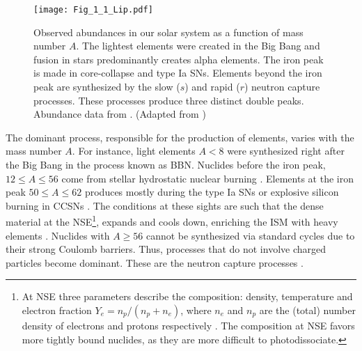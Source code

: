 \begin{figure}[t]
    \centering
    \texttt{[image: Fig\_1\_1\_Lip.pdf]}
    \caption{Observed abundances in our solar system as a function of mass number
        $A$. The lightest elements were created in the Big Bang and fusion in stars predominantly
        creates alpha elements. The iron peak is made in core-collapse and type
        Ia \acp{SN}. Elements beyond the iron peak are synthesized by the slow ($s$) and
        rapid ($r$) neutron capture processes. These processes produce three distinct double
        peaks. Abundance data from \citet{Lodders:2003}. (Adapted from \citet{Lippuner:2018phd})
    }
    \label{fig:nuc:fig11_lip}
\end{figure}


The dominant \nuc{} process, responsible for the production of elements, varies with the mass 
number $A$.
%
For instance, light elements $A<8$ were synthesized right after the Big Bang
in the process known as \ac{BBN}.
Nuclides before the iron peak, $12\leq A\leq 56$ come from stellar hydrostatic 
nuclear burning \citep[\eg][]{Rolfs:1988,Hasen:2004}.
Elements at the iron peak $50\leq A \leq 62$ produces mostly 
during the type Ia \acp{SN} or explosive silicon burning in \acp{CCSN} \citep[\eg]{Woosley:2002}. 
The conditions at these sights are such that the dense material at the \ac{NSE}\footnote{
    At \ac{NSE} three parameters describe the composition: 
    density, temperature and electron fraction $Y_e = n_p/(n_p + n_e)$, 
    where $n_e$ and $n_p$ are the (total) number density of electrons and protons 
    respectively \citep{Seitenzahl:2009}. 
    The composition at \ac{NSE} favors more tightly bound nuclides,
    as they are more difficult to photodissociate.
}, 
expands and cools down, enriching the \ac{ISM} with heavy elements \citep{Iwamoto:2000as}. 
%
Nuclides with $A\geq 56$ cannot be synthesized via standard cycles due to their 
strong Coulomb barriers. 
Thus, processes that do not involve charged particles become dominant. 
These are the neutron capture processes \citep{Burbidge:1957}.


